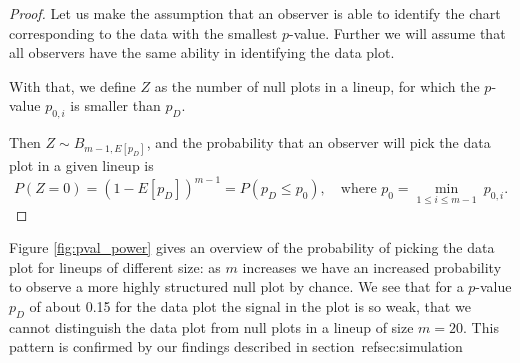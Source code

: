 \documentclass{article}
\newcommand{\red}[1]{{\color{red} #1}} %
\begin{document}
\begin{proof}
Let us make the assumption that an observer is able to identify  the chart corresponding to the data with the smallest $p$-value. Further we will assume that all observers  have the same ability in identifying the data plot.

With that, we define $Z$  as the number of null plots in a lineup, for which the $p$-value $p_{0,i}$ is smaller than $p_D$.  

Then $Z \sim B_{m-1, E[p_D]}$, and the probability that an observer will pick the data plot in a given lineup is 
\[
P(Z=0) = \left(1 - E[p_D] \right)^{m-1} = P(p_D \le p_0), \ \ \ \text{ where } p_0 = \min_{1 \le i \le m-1}  \ p_{0,i}.
\]
\end{proof}



Figure \ref{fig:pval_power} gives an overview of the probability of picking the data plot for lineups of different size: as $m$ increases we have an increased probability to observe a more highly structured null plot by chance. We see that for a $p$-value $p_D$ of about 0.15 for the data plot the signal in the plot is so weak, that we cannot distinguish the data plot from null plots in a lineup of size $m=20$.  This pattern is confirmed by our findings described in section~ref{sec:simulation}



\end{document}
